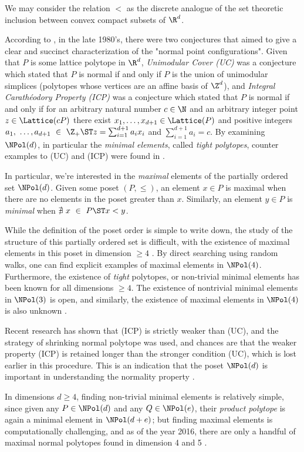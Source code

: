 \documentclass{TC}
\begin{document}
We may consider the relation $<$ as the discrete analogue of the set theoretic inclusion between convex compact subsets of $\R^d$. 

According to \cite{BrunsGubeladzeNormalPolytopes}, in the late 1980's, there were two conjectures that aimed to give a clear and succinct characterization of the "normal point configurations". Given that $P$ is some lattice polytope in $\R^d$,  \emph{Unimodular Cover (UC)} was a conjecture which stated that $P$ is normal if and only if $P$ is the union of unimodular simplices (polytopes whose vertices are an affine basis of $\Z^d$), and \emph{Integral Carath\'eodory Property (ICP)}
was a conjecture which stated that $P$ is normal if and only if for an arbitrary natural number $c \in \N$ and an arbitrary integer point $z \in \Lattice(cP)$ there exist $x_1, \ldots, x_{d+1} \in \Lattice(P)$ and positive integers $a_1,~\ldots, a_{d+1}~\in~\Z_+ \ST z=\sum_{i=1}^{d+1} a_i x_i$ and $\sum_{i=1}^{d+1}  a_i = c$. By examining $\NPol(d)$, in particular the \emph{minimal elements}, called \emph{tight polytopes}, counter examples to (UC) and (ICP) were found in \cite{bruns_gubeladze_1999, bruns_gubeladze_henk_martin_weismantel_1999}. 

In particular, we're interested in the \emph{maximal} elements of the partially ordered set $\NPol(d)$. Given some poset $(P, \leq)$, an element $x \in P$ is maximal when there are no elements in the poset greater than $x$. Similarly, an element $y \in P$ is \emph{minimal} when $\nexists~x~\in~P \ST x < y$.

While the definition of the poset order is simple to write down, the study of the structure of this partially ordered set is difficult, with the existence of maximal elements in this poset in dimension $\geq 4$ \cite{GubeladzePosetCones}. By direct searching using random walks, one can find explicit examples of maximal elements in $\NPol(4)$. Furthermore, the existence of \emph{tight} polytopes, or non-trivial minimal elements has been known for all dimensions $\geq 4$. The existence of nontrivial minimal elements in $\NPol(3)$ is open, and similarly, the existence of maximal elements in $\NPol(4)$ is also unknown \cite{BrunsGubeladzeNormalPolytopes}.  

Recent research has shown that (ICP) is strictly weaker than (UC), and the strategy of shrinking normal polytope was used, and chances are that the weaker property (ICP) is retained longer than the stronger condition (UC), which is lost earlier in this procedure. This is an indication that the poset $\NPol(d)$ is important in understanding the normality property \cite{bruns_2007, bruns_gubeladze_1999, bruns_gubeladze_henk_martin_weismantel_1999}.

In dimensions $d \geq 4$, finding non-trivial minimal elements is relatively simple, since given any $P \in \NPol(d)$ and any $Q \in \NPol(e)$, their \emph{product polytope} is again a minimal element in $\NPol(d+e)$; but finding maximal elements is computationally challenging, and as of the year 2016, there are only a handful of maximal normal polytopes found in dimension 4 and 5 \cite{BrunsGubeladzeNormalPolytopes}.
\end{document}
